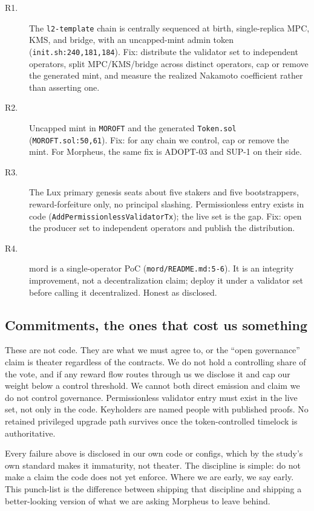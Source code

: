 \documentclass[11pt,a4paper]{article}
\newcommand{\code}[1]{\texttt{\small #1}}
\begin{document}
\begin{description}
  \item[R1.] The \code{l2-template} chain is centrally sequenced at birth, single-replica MPC,
    KMS, and bridge, with an uncapped-mint admin token (\code{init.sh:240,181,184}). Fix:
    distribute the validator set to independent operators, split MPC/KMS/bridge across distinct
    operators, cap or remove the generated mint, and measure the realized Nakamoto coefficient
    rather than asserting one.
  \item[R2.] Uncapped mint in \code{MOROFT} and the generated \code{Token.sol}
    (\code{MOROFT.sol:50,61}). Fix: for any chain we control, cap or remove the mint. For
    Morpheus, the same fix is ADOPT-03 and SUP-1 on their side.
  \item[R3.] The Lux primary genesis seats about five stakers and five bootstrappers,
    reward-forfeiture only, no principal slashing. Permissionless entry exists in code
    (\code{AddPermissionlessValidatorTx}); the live set is the gap. Fix: open the producer set
    to independent operators and publish the distribution.
  \item[R4.] mord is a single-operator PoC (\code{mord/README.md:5-6}). It is an integrity
    improvement, not a decentralization claim; deploy it under a validator set before calling it
    decentralized. Honest as disclosed.
\end{description}

\subsection{Commitments, the ones that cost us something}

These are not code. They are what we must agree to, or the ``open governance'' claim is theater
regardless of the contracts. We do not hold a controlling share of the vote, and if any reward
flow routes through us we disclose it and cap our weight below a control threshold. We cannot
both direct emission and claim we do not control governance. Permissionless validator entry must
exist in the live set, not only in the code. Keyholders are named people with published proofs.
No retained privileged upgrade path survives once the token-controlled timelock is authoritative.

Every failure above is disclosed in our own code or configs, which by the study's own standard
makes it immaturity, not theater. The discipline is simple: do not make a claim the code does
not yet enforce. Where we are early, we say early. This punch-list is the difference between
shipping that discipline and shipping a better-looking version of what we are asking Morpheus to
leave behind.
\end{document}
